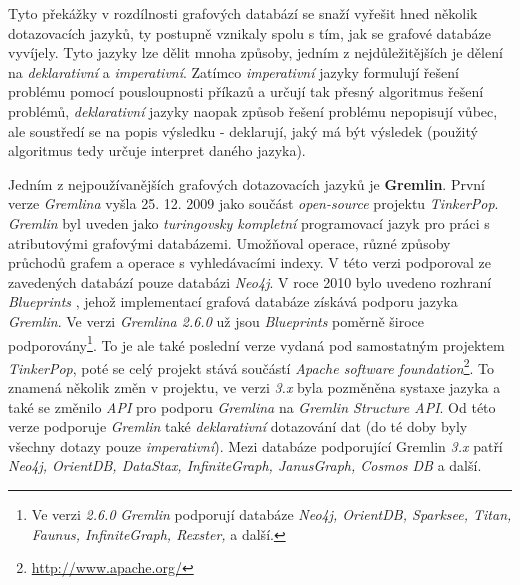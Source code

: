 Tyto překážky v rozdílnosti grafových databází se snaží vyřešit hned několik dotazovacích jazyků, ty postupně vznikaly spolu s tím, jak se grafové databáze vyvíjely. Tyto jazyky lze dělit mnoha způsoby, jedním z nejdůležitějších je dělení na \textit{deklarativní} a \textit{imperativní}. Zatímco \textit{imperativní} jazyky formulují řešení problému pomocí pousloupnosti příkazů a určují tak přesný algoritmus řešení problémů, \textit{deklarativní} jazyky naopak způsob řešení problému nepopisují vůbec, ale soustředí se na popis výsledku - deklarují, jaký má být výsledek (použitý algoritmus tedy určuje interpret daného jazyka).\cite{Chao16}

Jedním z nejpoužívanějších grafových dotazovacích jazyků je \textbf{Gremlin}. První verze \textit{Gremlina} vyšla 25. 12. 2009 \cite{Gremlin09} jako součást \textit{open-source} projektu \textit{TinkerPop}. \textit{Gremlin} byl uveden jako \textit{turingovsky kompletní} programovací jazyk pro práci s atributovými grafovými databázemi. Umožňoval \textit{} operace, různé způsoby průchodů grafem a operace s vyhledávacími indexy. V této verzi podporoval ze zavedených databází pouze databázi \textit{Neo4j}. 
V roce 2010 bylo uvedeno rozhraní \textit{Blueprints} \cite{Blueprints10}, jehož implementací grafová databáze získává podporu jazyka \textit{Gremlin}. 
Ve verzi \textit{Gremlina 2.6.0} \cite{Gremlin14} už jsou \textit{Blueprints} poměrně široce podporovány\footnote{Ve verzi \textit{2.6.0} \textit{Gremlin} podporují databáze \textit{Neo4j, OrientDB, Sparksee, Titan, Faunus, InfiniteGraph, Rexster,} a další.}. To je ale také poslední verze vydaná pod samostatným projektem \textit{TinkerPop}, poté se celý projekt stává součástí \textit{Apache software foundation}\footnote{\url{http://www.apache.org/}}. To znamená několik změn v projektu, ve verzi \textit{3.x} \cite{Gremlin17} byla pozměněna systaxe jazyka a také se změnilo \textit{API} pro podporu \textit{Gremlina} na \textit{Gremlin Structure API}. Od této verze podporuje \textit{Gremlin} také \textit{deklarativní} dotazování dat (do té doby byly všechny dotazy pouze \textit{imperativní}).  Mezi databáze podporující Gremlin \textit{3.x} patří \textit{Neo4j, OrientDB, DataStax, InfiniteGraph, JanusGraph, Cosmos DB} a další.

